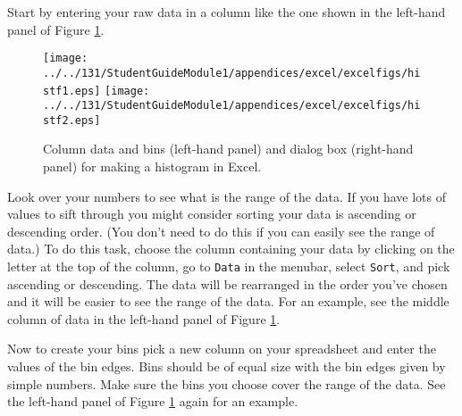 Start by entering your raw data in a column like the one shown in the left-hand panel of Figure \ref{hist2}.
\begin{figure}[b!]
\begin{center}
\texttt{[image: ../../131/StudentGuideModule1/appendices/excel/excelfigs/histf1.eps]}
\hspace{0.4in}
\texttt{[image: ../../131/StudentGuideModule1/appendices/excel/excelfigs/histf2.eps]}
\caption{Column data and bins (left-hand panel) and dialog box (right-hand panel)  for making a histogram in Excel.}\label{hist2}
\end{center}
\end{figure}
Look over your numbers to see what is the range of the data.
If you have lots of values to sift through you might consider sorting your data is ascending or descending order.
(You don't need to do this if you can easily see the range of data.)
To do this task, choose the column containing your data by clicking on the letter at the top of the column, 
go to {\tt Data} in the menubar, select {\tt Sort}, and pick
ascending or descending.
The data will be rearranged in the order you've chosen and it will be easier to see the range of the data.
For an example, see the middle column of data in the left-hand panel of Figure \ref{hist2}.


Now to create your bins pick a new column on your spreadsheet and enter the values of the bin edges.
Bins should be of equal size with the bin edges given by simple numbers.
Make sure the bins you choose cover the range of the data. 
See the left-hand panel of Figure \ref{hist2} again for an example.

\newpage

